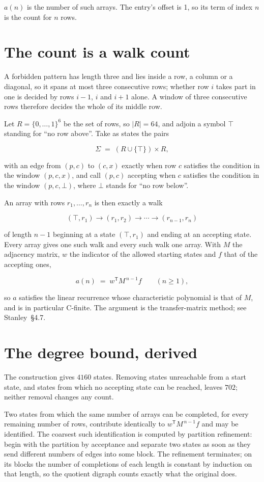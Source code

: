 \documentclass[11pt]{article}
\theoremstyle{definition}
\begin{document}
$a(n)$ is the number of such arrays. The entry's offset is 1, so its term of index $n$ is the count for $n$ rows.

\section{The count is a walk count}

A forbidden pattern has length three and lies inside a row, a column or a diagonal, so it spans at most three consecutive rows; whether row $i$ takes part in one is decided by rows $i-1$, $i$ and $i+1$ alone. A window of three consecutive rows therefore decides the whole of its middle row.

Let $R = \{0,\dots,1\}^{6}$ be the set of rows, so $|R| = 64$, and adjoin a symbol $\top$ standing for ``no row above''. Take as states the pairs

\[\Sigma \;=\; (R \cup \{\top\}) \times R,\]

with an edge from $(p,c)$ to $(c,x)$ exactly when row $c$ satisfies the condition in the window $(p,c,x)$, and call $(p,c)$ accepting when $c$ satisfies the condition in the window $(p,c,\bot)$, where $\bot$ stands for ``no row below''.

An array with rows $r_1,\dots,r_n$ is then exactly a walk

\[(\top,r_1) \to (r_1,r_2) \to \cdots \to (r_{n-1},r_n)\]

of length $n-1$ beginning at a state $(\top,r_1)$ and ending at an accepting state. Every array gives one such walk and every such walk one array. With $M$ the adjacency matrix, $w$ the indicator of the allowed starting states and $f$ that of the accepting ones,

\[a(n) \;=\; w^{\mathsf T} M^{\,n-1} f \qquad (n \ge 1),\]

so $a$ satisfies the linear recurrence whose characteristic polynomial is that of $M$, and is in particular C-finite. The argument is the transfer-matrix method; see Stanley~\S4.7.

\section{The degree bound, derived}

The construction gives $4160$ states. Removing states unreachable from a start state, and states from which no accepting state can be reached, leaves $702$; neither removal changes any count.

Two states from which the same number of arrays can be completed, for every remaining number of rows, contribute identically to $w^{\mathsf T}M^{\,n-1}f$ and may be identified. The coarsest such identification is computed by partition refinement: begin with the partition by acceptance and separate two states as soon as they send different numbers of edges into some block. The refinement terminates; on its blocks the number of completions of each length is constant by induction on that length, so the quotient digraph counts exactly what the original does.
\end{document}
